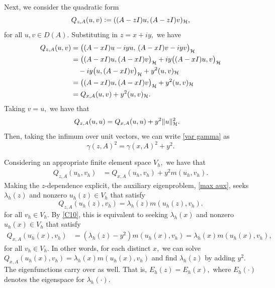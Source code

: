 Next, we consider the quadratic form 
\begin{equation}
    Q_{z, A}(u, v) \vcentcolon= ((A-zI)u, (A-zI)v)_{\mathcal{H}},
\end{equation}
for all $u, v \in D(A).$
Substituting in $z = x+iy,$ we have
\begin{align}
    Q_{z,A}(u,v)
    &= \bigl((A-xI)u-iyu,\,(A-xI)v-iyv\bigr)_{\mathcal{H}} \\
    &= \bigl((A-xI)u,(A-xI)v\bigr)_{\mathcal{H}}
       + iy\bigl((A-xI)u,v\bigr)_{\mathcal{H}} \notag\\
    &\quad
       - iy\bigl(u,(A-xI)v\bigr)_{\mathcal{H}}
       + y^2(u,v)_{\mathcal{H}} \\
    &= \bigl((A-xI)u,(A-xI)v\bigr)_{\mathcal{H}}
       + y^2(u,v)_{\mathcal{H}} \\
    &= Q_{x,A}(u,v)+y^2(u,v)_{\mathcal{H}}.
\end{align}
Taking $v=u,$ we have that
\begin{align}
    Q_{z,A}(u,u)
    &= Q_{x,A}(u,u)+y^2\|u\|_{\mathcal{H}}^2.
\end{align}
Then, taking the infimum over unit vectors, we can write \eqref{var gamma} as
\begin{equation}
    \gamma(z, A)^2 = \gamma(x, A)^2 + y^2. 
\end{equation}


Considering an appropriate finite element space $V_h,$ we have that
\begin{align} \label{C10}
    Q_{z, A}(u_h, v_h) &= Q_{x, A}(u_h, v_h) + y^2 m(u_h, v_h).
\end{align}
Making the $z$-dependence explicit, the auxiliary eigenproblem, \eqref{max aux}, seeks $\lambda_h(z)$ and nonzero $u_h(z) \in V_h$ that satisfy
\begin{equation} \label{zval}
    Q_{z, A}(u_h(z), v_h) = \lambda_h(z) m(u_h(z), v_h).
\end{equation}
for all $v_h \in V_h.$
By \eqref{C10}, this is equivalent to seeking $\lambda_h(x)$ and nonzero $u_h(x) \in V_h$ that satisfy
\begin{align} \label{xval}
    Q_{x, A}(u_h(x), v_h) &= (\lambda_h(z) - y^2) m(u_h(x), v_h) = \lambda_h(x) m(u_h(x), v_h), 
\end{align}
for all $v_h \in V_h.$
In other words, for each distinct $x,$ we can solve $Q_{x, A}(u_h(x), v_h) = \lambda_h(x) m(u_h(x), v_h)$ and find $\lambda_h(z)$ by adding $y^2.$ The eigenfunctions carry over as well. That is, $E_h(z) = E_h(x),$ where $E_h(\cdot)$ denotes the eigenspace for $\lambda_h(\cdot).$


